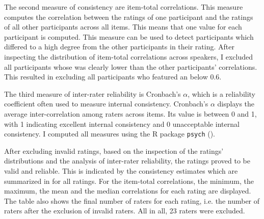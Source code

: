 The second measure of consistency are item-total correlations. This measure computes the correlation between the ratings of one participant and the ratings of all other participants across all items. This means that one value for each participant is computed. This measure can be used to detect participants which differed to a high degree from the other participants in their rating. After inspecting the distribution of item-total correlations across speakers, I excluded all participants whose  was clearly lower than the other participants' correlations. This resulted in excluding all participants who featured an  below 0.6. 

The third measure of inter-rater reliability is Cronbach's $\alpha$, which is a reliability coefficient often used to measure internal consistency. Cronbach's $\alpha$ displays the average inter-correlation among raters across items. Its value is between 0 and 1, with 1 indicating excellent internal consistency and 0 unacceptable internal consistency. 
I computed all measures using the R package \texttt{psych} (\citealt{Revelle.2017}).




After excluding invalid ratings, based on the inspection of the ratings' distributions and the analysis of inter-rater reliability, the ratings proved to be valid and reliable. This is indicated by the consistency estimates which are summarized in  for all ratings. For the item-total correlations, the minimum, the maximum, the mean and the median correlations for each rating are displayed. The table also shows the final number of raters for each rating, i.e. the number of raters after the exclusion of invalid raters. All in all, 23 raters were excluded.


